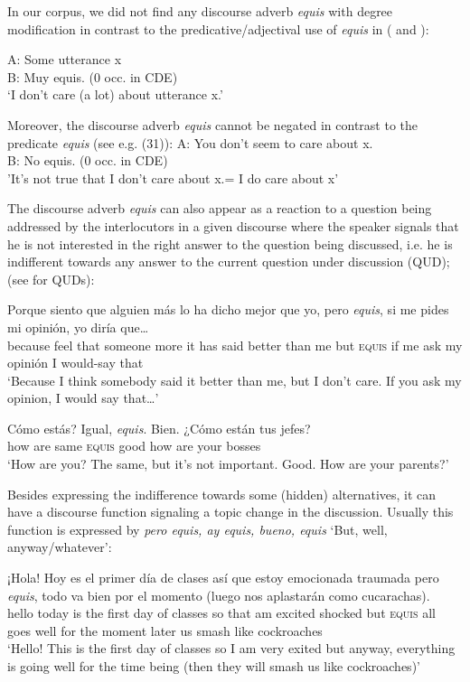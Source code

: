 \documentclass[output=paper
,modfonts
,nonflat]{langsci/langscibook}
\begin{document}
In our corpus, we did not find any discourse adverb \textit{equis} with degree modification in contrast to the predicative/adjectival use of \textit{equis} in ( and ):

\ea
\gll A: Some utterance x \\
B: Muy equis. (0 occ. in CDE)\\
\glt ‘I don’t care (a lot) about utterance x.’
\z

Moreover, the discourse adverb \textit{equis} cannot be negated in contrast to the predicate \textit{equis} (see e.g. (31)):
\ea
\gll A: You don't seem to care about x. \\
B: No equis. (0 occ. in CDE)\\
\glt 'It's not true that I don't care about x.= I do care about x'
\z 

The discourse adverb \textit{equis} can also appear as a reaction to a question being addressed by the interlocutors in a given discourse where the speaker signals that he is not interested in the right answer to the question being discussed, i.e. he is indifferent towards any answer to the current question under discussion (QUD); (see \citealt{Roberts1996} for QUDs):

\ea
\gll Porque siento que alguien más lo ha dicho mejor que yo, pero \textit{equis}, si me pides mi opinión, yo diría que…\\
because feel that someone more it has said better than me but \textsc{equis}	if me ask my opinión I would-say that\\
\glt ‘Because I think somebody said it better than me, but I don’t care. If you ask my opinion, I would say that…’
\z

\ea
{}Cómo	estás? Igual, \textit{equis}. Bien. {¿}Cómo están tus jefes?\\
how are same \textsc{equis} good how are your bosses\\
\glt ‘How are you? The same, but it’s not important. Good. How are your parents?’
\z

Besides expressing the indifference towards some (hidden) alternatives, it can have a discourse function signaling a topic change in the discussion. Usually this function is expressed by \textit{pero equis, ay equis, bueno, equis} ‘But, well, anyway/whatever’:

\ea
\gll ¡Hola! Hoy es el primer día de clases así que estoy emocionada traumada pero \textit{equis}, todo va bien por el momento (luego nos aplastarán como cucarachas).\\
hello today is the first day of classes so that am excited shocked but \textsc{equis} all goes well for the moment later us smash like cockroaches\\
\glt ‘Hello! This is the first day of classes so I am very exited but anyway, everything is going well for the time being (then they will smash us like cockroaches)’
\z
\end{document}

